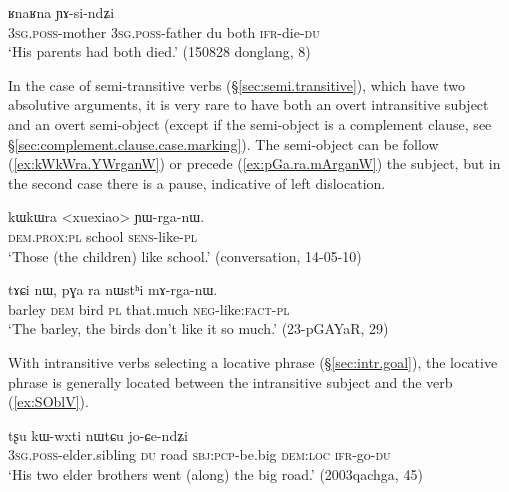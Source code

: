 \begin{exe}
	\ex \label{ex:RnaRna.YAsindZi}
	\gll [ɯ-mu ɯ-wa ni] ʁnaʁna ɲɤ-si-ndʑi \\
	\textsc{3sg}.\textsc{poss}-mother 	\textsc{3sg}.\textsc{poss}-father du both \textsc{ifr}-die-\textsc{du} \\ 
	\glt `His parents had both died.' (150828 donglang, 8)
\end{exe}

In the case of semi-transitive verbs (§\ref{sec:semi.transitive}), which have two absolutive arguments, it is very rare to have both an overt intransitive subject and an overt semi-object (except if the semi-object is a complement clause, see §\ref{sec:complement.clause.case.marking}). The semi-object can be follow (\ref{ex:kWkWra.YWrganW}) or precede (\ref{ex:pGa.ra.mArganW}) the subject, but in the second case there is a pause, indicative of left dislocation.

\begin{exe}
\ex \label{ex:kWkWra.YWrganW}
\gll kɯkɯra <xuexiao> ɲɯ-rga-nɯ. \\
\textsc{dem}.\textsc{prox}:\textsc{pl} school \textsc{sens}-like-\textsc{pl} \\
\glt `Those (the children) like school.' (conversation, 14-05-10)
\end{exe}

\begin{exe}
\ex \label{ex:pGa.ra.mArganW}
\gll  tɤɕi nɯ, pɣa ra nɯstʰi mɤ-rga-nɯ. \\
barley \textsc{dem} bird \textsc{pl} that.much \textsc{neg}-like:\textsc{fact}-\textsc{pl} \\
\glt `The barley, the birds don't like it so much.' (23-pGAYaR, 29)
\end{exe}

 With intransitive verbs selecting a locative phrase (§\ref{sec:intr.goal}), the locative phrase is generally located between the intransitive subject and the verb (\ref{ex:SOblV}). 

\begin{exe}
\ex \label{ex:SOblV}
\gll [ɯ-pi ni] tʂu kɯ-wxti nɯtɕu jo-ɕe-ndʑi \\
\textsc{3sg}.\textsc{poss}-elder.sibling \textsc{du} road \textsc{sbj}:\textsc{pcp}-be.big \textsc{dem}:\textsc{loc} \textsc{ifr}-go-\textsc{du} \\
\glt `His two elder brothers went (along) the big road.' (2003qachga, 45)
\end{exe}

